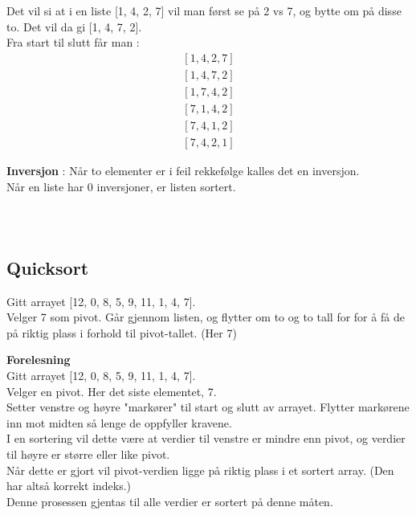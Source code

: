 \documentclass[11pt]{article}
\begin{document}
Det vil si at i en liste [1, 4,  2, 7] vil man først se på 2 vs 7, og bytte om på disse to.
Det vil da gi [1, 4, 7, 2].\\ Fra start til slutt får man : \\
\begin{equation}
	\begin{split}
		[1, 4, 2, 7] \\
		[1, 4, 7, 2] \\
		[1, 7, 4, 2] \\
		[7, 1, 4, 2] \\
		[7, 4, 1, 2] \\
		[7, 4, 2, 1]
	\end{split}
\end{equation}

\textbf{Inversjon} : Når to elementer er i feil rekkefølge kalles det en inversjon. \\
Når en liste har 0 inversjoner, er listen sortert.

\begin{lstlisting}
			
			
		\end{lstlisting}

\subsection{Quicksort}
Gitt arrayet [12, 0, 8, 5, 9, 11, 1, 4, 7]. \\

Velger 7 som pivot. Går gjennom listen, og flytter om to og to tall for for å få de på riktig plass i forhold til pivot-tallet. (Her 7)

\textbf{Forelesning}\\
Gitt arrayet [12, 0, 8, 5, 9, 11, 1, 4, 7]. \\
Velger en pivot. Her det siste elementet, 7. \\

Setter venstre og høyre "markører" til start og slutt av arrayet.
Flytter markørene inn mot midten så lenge de oppfyller kravene.\\
I en sortering vil dette være at verdier til venstre er mindre enn pivot,
og verdier til høyre er større eller like pivot. \\
Når dette er gjort vil pivot-verdien ligge på riktig plass i et sortert array. (Den har altså korrekt indeks.) \\

Denne prosessen gjentas til alle verdier er sortert på denne måten. \\
\end{document}
